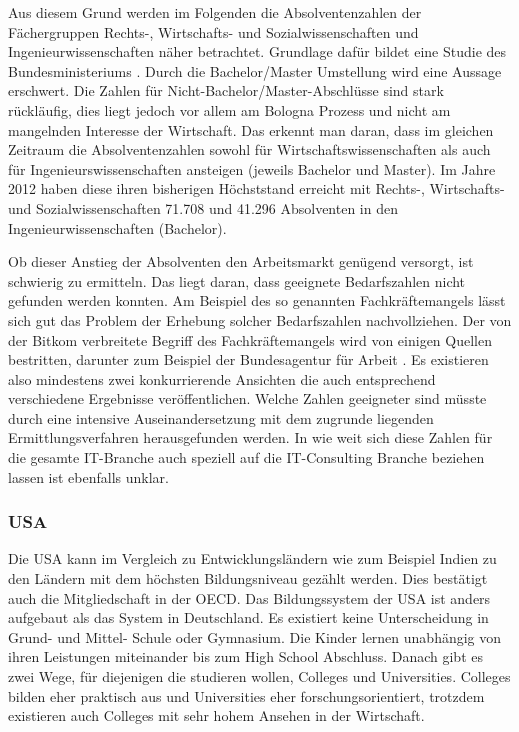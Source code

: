 Aus diesem Grund werden im Folgenden die Absolventenzahlen der Fächergruppen Rechts-, Wirtschafts- und Sozialwissenschaften und Ingenieurwissenschaften näher betrachtet.
Grundlage dafür bildet eine Studie des Bundesministeriums \cite{absolventen}. Durch die Bachelor/Master Umstellung wird eine Aussage erschwert. Die Zahlen für Nicht-Bachelor/Master-Abschlüsse sind stark rückläufig, dies liegt jedoch vor allem am Bologna Prozess und nicht am mangelnden Interesse der Wirtschaft. Das erkennt man daran, dass im gleichen Zeitraum die Absolventenzahlen sowohl für Wirtschaftswissenschaften als auch für Ingenieurswissenschaften ansteigen (jeweils Bachelor und Master). Im Jahre 2012 haben diese ihren bisherigen Höchststand erreicht mit Rechts-, Wirtschafts- und Sozialwissenschaften 71.708 und 41.296 Absolventen in den Ingenieurwissenschaften (Bachelor).

Ob dieser Anstieg der Absolventen den Arbeitsmarkt genügend versorgt, ist schwierig zu ermitteln. Das liegt daran, dass geeignete Bedarfszahlen nicht gefunden werden konnten. Am Beispiel des so genannten Fachkräftemangels lässt sich gut das Problem der Erhebung solcher Bedarfszahlen nachvollziehen. Der von der Bitkom verbreitete Begriff \cite{fachkraft} des Fachkräftemangels wird von einigen Quellen bestritten, darunter zum Beispiel der Bundesagentur für Arbeit \cite{fachkraftnein}. Es existieren also mindestens zwei konkurrierende Ansichten die auch entsprechend verschiedene Ergebnisse veröffentlichen. Welche Zahlen geeigneter sind müsste durch eine intensive Auseinandersetzung mit dem zugrunde liegenden Ermittlungsverfahren herausgefunden werden.  In wie weit sich diese Zahlen für die gesamte IT-Branche auch speziell auf die IT-Consulting Branche beziehen lassen ist ebenfalls unklar.

\subsubsection*{USA}
Die USA kann im Vergleich zu Entwicklungsländern wie zum Beispiel Indien zu den Ländern mit dem höchsten Bildungsniveau gezählt werden. Dies bestätigt auch die Mitgliedschaft in der OECD. Das Bildungssystem der USA ist anders aufgebaut als das System in Deutschland. Es existiert keine Unterscheidung in Grund- und Mittel- Schule oder Gymnasium. Die Kinder lernen unabhängig von ihren Leistungen miteinander bis zum High School Abschluss. Danach gibt es zwei Wege, für diejenigen die studieren wollen, Colleges und Universities. Colleges bilden eher praktisch aus und Universities eher forschungsorientiert, trotzdem existieren auch Colleges mit sehr hohem Ansehen in der Wirtschaft. 

